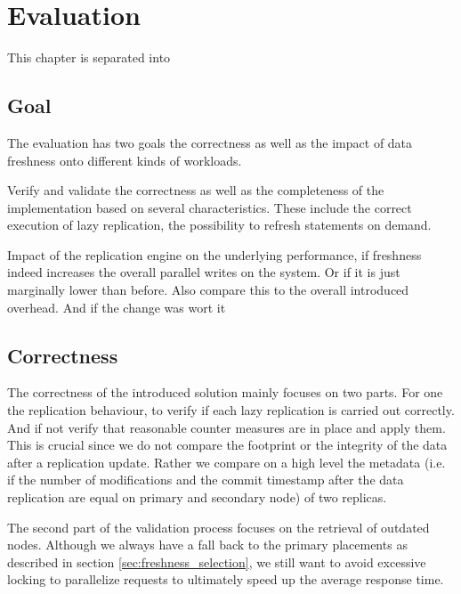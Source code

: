 \chapter{Evaluation}
\label{c:evaluation}

This chapter is separated into 

\section{Goal}
The evaluation has two goals the correctness as well as the impact of data freshness onto different kinds of workloads.

Verify and validate the correctness as well as the completeness of the implementation based on several characteristics.
These include the correct execution of lazy replication, the possibility to refresh statements on demand.

Impact of the replication engine on the underlying performance, if freshness indeed increases the overall parallel writes on the system.
Or if it is just marginally lower than before. Also compare this to the overall introduced overhead. And if the change was wort it



\section{Correctness}

The correctness of the introduced solution mainly focuses on two parts. For one the replication behaviour, to verify if each lazy replication is carried out correctly.
And if not verify that reasonable counter measures are in place and apply them. This is crucial since we do not compare the footprint or the integrity of the data after 
a replication update. Rather we compare on a high level the metadata 
(i.e. if the number of modifications and the commit timestamp after the data replication are equal on primary and secondary node) of two replicas. 

The second part of the validation process focuses on the retrieval of outdated nodes. Although we always have a fall back to the primary placements as described in section \ref{sec:freshness_selection},
we still want to avoid excessive locking to parallelize requests to ultimately speed up the average response time.



